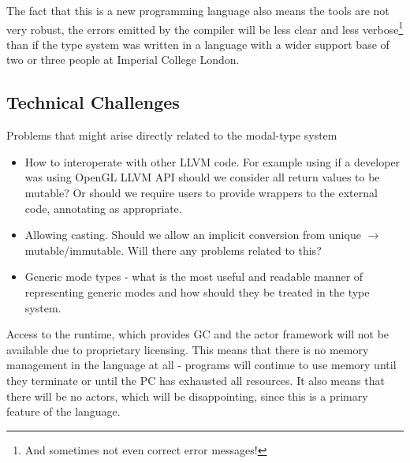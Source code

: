 \documentclass{article}
\begin{document}
The fact that this is a new programming language also means the tools are not
very robust, the errors emitted by the compiler will be less clear and less
verbose\footnote{And sometimes not even correct error messages!} than if the
type system was written in a language with a wider support base of two or
three people at Imperial College London.

\subsection{Technical Challenges}

Problems that might arise directly related to the modal-type system
	\begin{itemize}
		\item How to interoperate with other LLVM code. For example using if a
		developer was using OpenGL LLVM API should we consider all return
		values to be mutable? Or should we require users to provide wrappers
		to the external code, annotating as appropriate.
		\item Allowing casting. Should we allow an implicit conversion from unique
    $\to$ mutable/immutable. Will there any problems related to this?
		\item Generic mode types - what is the most useful and readable manner of
		representing generic modes and how should they be treated in the type system.
	\end{itemize}

Access to the runtime, which provides GC and the actor framework will not be
available due to proprietary licensing. This means that there is no memory
management in the language at all - programs will continue to use memory until they
terminate or until the PC has exhausted all resources. It also means that there will be
no actors, which will be disappointing, since this is a primary feature of the language.



\end{document}
